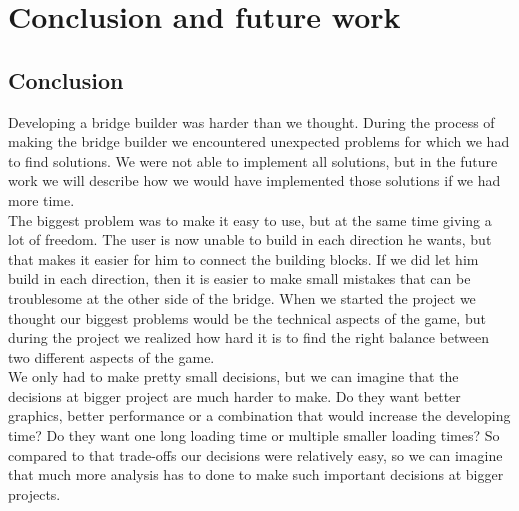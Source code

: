 \section{Conclusion and future work}
\subsection{Conclusion}
Developing a bridge builder was harder than we thought. During the process of making the bridge builder we encountered unexpected problems for which we had to find solutions. We were not able to implement all solutions, but in the future work we will describe how we would have implemented those solutions if we had more time. \\

The biggest problem was to make it easy to use, but at the same time giving a lot of freedom. The user is now unable to build in each direction he wants, but that makes it easier for him to connect the building blocks. If we did let him build in each direction, then it is easier to make small mistakes that can be troublesome at the other side of the bridge. When we started the project we thought our biggest problems would be the technical aspects of the game, but during the project we realized how hard it is to find the right balance between two different aspects of the game.  \\

We only had to make pretty small decisions, but we can imagine that the decisions at bigger project are much harder to make. Do they want better graphics, better performance or a combination that would increase the developing time? Do they want one long loading time or multiple smaller loading times? So compared to that trade-offs our decisions were relatively easy, so we can imagine that much more analysis has to done to make such important decisions at bigger projects.\\
